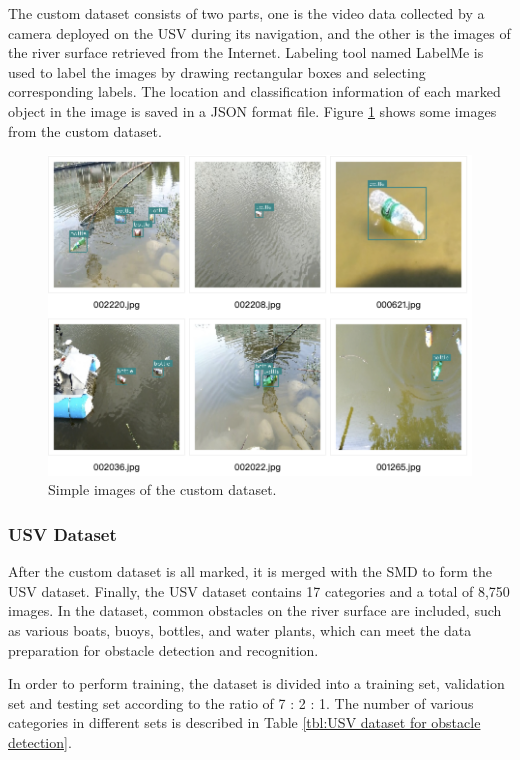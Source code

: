 \documentclass[sensors,article,submit,moreauthors,pdftex]{Definitions/mdpi}
\begin{document}
The custom dataset consists of two parts, one is the video data collected by a camera deployed on the USV during its navigation, and the other is the images of the river surface retrieved from the Internet. Labeling tool named LabelMe is used to label the images by drawing rectangular boxes and selecting corresponding labels. The location and classification information of each marked object in the image is saved in a JSON format file. Figure \ref{fig:Simple images of the custom dataset} shows some images from the custom dataset. 

\begin{figure}[htbp]
\centering
\includegraphics[width=1\columnwidth]{images/custom-dataset-example.png}
\caption{Simple images of the custom dataset.}
\label{fig:Simple images of the custom dataset}
\end{figure}


\subsubsection{USV Dataset}
After the custom dataset is all marked, it is merged with the SMD to form the USV dataset. Finally, the USV dataset contains 17 categories and a total of 8,750 images. In the dataset, common obstacles on the river surface are included, such as various boats, buoys, bottles, and water plants, which can meet the data preparation for obstacle detection and recognition.

In order to perform training, the dataset is divided into a training set, validation set and testing set according to the ratio of 7 : 2 : 1. The number of various categories in different sets is described in Table \ref{tbl:USV dataset for obstacle detection}.
\end{document}

